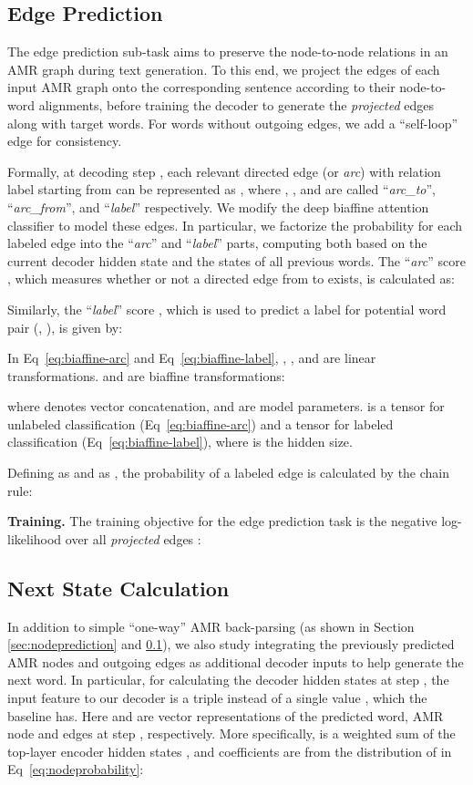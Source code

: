 \documentclass[11pt,a4paper]{article}
\begin{document}
\subsection{Edge Prediction}
\label{sec:edgeprediction}
The edge prediction sub-task aims to preserve the node-to-node relations in an AMR graph during text generation.
To this end, we project the edges of each input AMR graph onto the corresponding sentence according to their node-to-word alignments, before training the decoder to generate the \textit{projected} edges along with target words.
For words without outgoing edges, we add a ``self-loop'' edge for consistency.



Formally, at decoding step , each relevant directed edge (or \textit{arc}) with relation label  starting from  can be represented as , where , ,  and   are called ``{\it arc\_to}'', ``{\it arc\_from}'', and ``{\it label}'' respectively.
We modify the deep biaffine attention classifier \cite{dozat2016deep} to model these edges. 
In particular, we factorize the probability for each labeled edge into the ``{\it arc}'' and ``{\it label}'' parts, computing both based on the current decoder hidden state and the states of all previous words.
The ``{\it arc}'' score , which measures whether or not a directed edge from  to  exists, is calculated as:

Similarly, the ``{\it label}'' score , which is used to predict a label for potential word pair (, ), is given by:


In Eq~\ref{eq:biaffine-arc} and Eq~\ref{eq:biaffine-label}, , ,  and  are linear transformations.  and  are biaffine transformations:

where  denotes vector concatenation,  and  are model parameters. 
 is a  tensor for unlabeled classification (Eq~\ref{eq:biaffine-arc}) and a  tensor for labeled classification (Eq~\ref{eq:biaffine-label}), where  is the hidden size.


Defining  as  and  as ,
the probability of a labeled edge  is calculated by the chain rule:


\noindent\textbf{Training.}
The training objective for the edge prediction task is the negative log-likelihood over all {\it projected} edges :




\subsection{Next State Calculation}
\label{sec:decinput}
In addition to simple ``one-way'' AMR back-parsing (as shown in Section \ref{sec:nodeprediction} and \ref{sec:edgeprediction}), we also study integrating the previously predicted AMR nodes and outgoing edges as additional decoder inputs to help generate the next word. 
In particular, for calculating the decoder hidden states  at step , the input feature to our decoder is a triple  instead of a single value , which the baseline has. Here  and  are vector representations of the predicted word, AMR node and edges at step , respectively. 
More specifically,  is a weighted sum of the top-layer encoder hidden states , and coefficients are from the distribution of  in Eq~\ref{eq:nodeprobability}:
\end{document}
